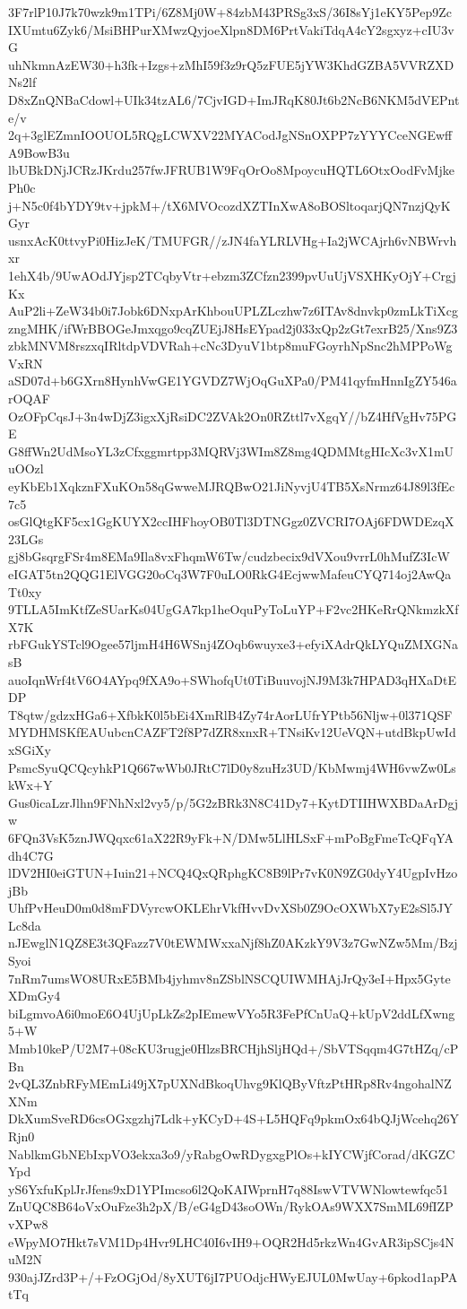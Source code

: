 3F7rlP10J7k70wzk9m1TPi/6Z8Mj0W+84zbM43PRSg3xS/36I8sYj1eKY5Pep9Zc
IXUmtu6Zyk6/MsiBHPurXMwzQyjoeXlpn8DM6PrtVakiTdqA4cY2sgxyz+cIU3vG
uhNkmnAzEW30+h3fk+Izgs+zMhI59f3z9rQ5zFUE5jYW3KhdGZBA5VVRZXDNs2lf
D8xZnQNBaCdowl+UIk34tzAL6/7CjvIGD+ImJRqK80Jt6b2NcB6NKM5dVEPnte/v
2q+3glEZmnIOOUOL5RQgLCWXV22MYACodJgNSnOXPP7zYYYCceNGEwffA9BowB3u
lbUBkDNjJCRzJKrdu257fwJFRUB1W9FqOrOo8MpoycuHQTL6OtxOodFvMjkePh0c
j+N5c0f4bYDY9tv+jpkM+/tX6MVOcozdXZTInXwA8oBOSltoqarjQN7nzjQyKGyr
usnxAcK0ttvyPi0HizJeK/TMUFGR//zJN4faYLRLVHg+Ia2jWCAjrh6vNBWrvhxr
1ehX4b/9UwAOdJYjsp2TCqbyVtr+ebzm3ZCfzn2399pvUuUjVSXHKyOjY+CrgjKx
AuP2li+ZeW34b0i7Jobk6DNxpArKhbouUPLZLczhw7z6ITAv8dnvkp0zmLkTiXcg
zngMHK/ifWrBBOGeJmxqgo9cqZUEjJ8HsEYpad2j033xQp2zGt7exrB25/Xns9Z3
zbkMNVM8rszxqIRltdpVDVRah+cNc3DyuV1btp8muFGoyrhNpSnc2hMPPoWgVxRN
aSD07d+b6GXrn8HynhVwGE1YGVDZ7WjOqGuXPa0/PM41qyfmHnnIgZY546arOQAF
OzOFpCqsJ+3n4wDjZ3igxXjRsiDC2ZVAk2On0RZttl7vXgqY//bZ4HfVgHv75PGE
G8ffWn2UdMsoYL3zCfxggmrtpp3MQRVj3WIm8Z8mg4QDMMtgHIcXc3vX1mUuOOzl
eyKbEb1XqkznFXuKOn58qGwweMJRQBwO21JiNyvjU4TB5XsNrmz64J89l3fEc7c5
osGlQtgKF5cx1GgKUYX2ccIHFhoyOB0Tl3DTNGgz0ZVCRI7OAj6FDWDEzqX23LGs
gj8bGsqrgFSr4m8EMa9Ila8vxFhqmW6Tw/cudzbecix9dVXou9vrrL0hMufZ3IcW
eIGAT5tn2QQG1ElVGG20oCq3W7F0uLO0RkG4EcjwwMafeuCYQ714oj2AwQaTt0xy
9TLLA5ImKtfZeSUarKs04UgGA7kp1heOquPyToLuYP+F2vc2HKeRrQNkmzkXfX7K
rbFGukYSTcl9Ogee57ljmH4H6WSnj4ZOqb6wuyxe3+efyiXAdrQkLYQuZMXGNasB
auoIqnWrf4tV6O4AYpq9fXA9o+SWhofqUt0TiBuuvojNJ9M3k7HPAD3qHXaDtEDP
T8qtw/gdzxHGa6+XfbkK0l5bEi4XmRlB4Zy74rAorLUfrYPtb56Nljw+0l371QSF
MYDHMSKfEAUubcnCAZFT2f8P7dZR8xnxR+TNsiKv12UeVQN+utdBkpUwIdxSGiXy
PsmcSyuQCQcyhkP1Q667wWb0JRtC7lD0y8zuHz3UD/KbMwmj4WH6vwZw0LskWx+Y
Gus0icaLzrJlhn9FNhNxl2vy5/p/5G2zBRk3N8C41Dy7+KytDTIIHWXBDaArDgjw
6FQn3VsK5znJWQqxc61aX22R9yFk+N/DMw5LlHLSxF+mPoBgFmeTcQFqYAdh4C7G
lDV2HI0eiGTUN+Iuin21+NCQ4QxQRphgKC8B9lPr7vK0N9ZG0dyY4UgpIvHzojBb
UhfPvHeuD0m0d8mFDVyrcwOKLEhrVkfHvvDvXSb0Z9OcOXWbX7yE2sSl5JYLc8da
nJEwglN1QZ8E3t3QFazz7V0tEWMWxxaNjf8hZ0AKzkY9V3z7GwNZw5Mm/BzjSyoi
7nRm7umsWO8URxE5BMb4jyhmv8nZSblNSCQUIWMHAjJrQy3eI+Hpx5GyteXDmGy4
biLgmvoA6i0moE6O4UjUpLkZs2pIEmewVYo5R3FePfCnUaQ+kUpV2ddLfXwng5+W
Mmb10keP/U2M7+08cKU3rugje0HlzsBRCHjhSljHQd+/SbVTSqqm4G7tHZq/cPBn
2vQL3ZnbRFyMEmLi49jX7pUXNdBkoqUhvg9KlQByVftzPtHRp8Rv4ngohalNZXNm
DkXumSveRD6csOGxgzhj7Ldk+yKCyD+4S+L5HQFq9pkmOx64bQJjWcehq26YRjn0
NablkmGbNEbIxpVO3ekxa3o9/yRabgOwRDygxgPlOs+kIYCWjfCorad/dKGZCYpd
yS6YxfuKplJrJfens9xD1YPImcso6l2QoKAIWprnH7q88IswVTVWNlowtewfqc51
ZnUQC8B64oVxOuFze3h2pX/B/eG4gD43soOWn/RykOAs9WXX7SmML69fIZPvXPw8
eWpyMO7Hkt7sVM1Dp4Hvr9LHC40I6vIH9+OQR2Hd5rkzWn4GvAR3ipSCjs4NuM2N
930ajJZrd3P+/+FzOGjOd/8yXUT6jI7PUOdjcHWyEJUL0MwUay+6pkod1apPAtTq
